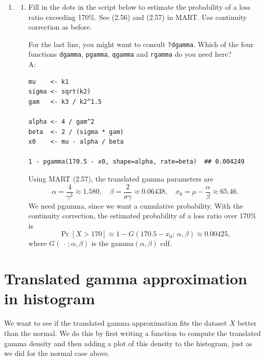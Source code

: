 \documentclass{article}
\begin{document}
\begin{enumerate}
  \item[$\boldsymbol{Q_4}$]
    \begin{enumerate}
      \item[] Fill in the dots in the script below to estimate the probability of a loss ratio exceeding 170\%. See (2.56) and (2.57) in MART. Use continuity correction as before.

      For the last line, you might want to consult \texttt{?dgamma}. Which of the four functions \texttt{dgamma}, \texttt{pgamma}, \texttt{qgamma} and \texttt{rgamma} do you need here?\\ A:

\begin{lstlisting}
mu    <- k1
sigma <- sqrt(k2)
gam   <- k3 / k2^1.5

alpha <- 4 / gam^2
beta  <- 2 / (sigma * gam)
x0    <- mu - alpha / beta

1 - pgamma(170.5 - x0, shape=alpha, rate=beta)  ## 0.004249
\end{lstlisting}

      Using MART (2.57), the translated gamma parameters are
      \[
        \alpha = \frac{4}{\gamma^2} \approx 1.580, \quad
        \beta  = \frac{2}{\sigma\gamma} \approx 0.06438, \quad
        x_0    = \mu - \frac{\alpha}{\beta} \approx 65.46.
      \]
      We need pgamma, since we want a cumulative probability. With the continuity correction, the estimated probability of a loss ratio over 170\% is
      \[
        \Pr[X > 170] \approx 1 - G(170.5 - x_0;\, \alpha, \beta) \approx 0.00425,
      \]
      where $G(\,\cdot\,;\alpha,\beta)$ is the $\mathrm{gamma}(\alpha,\beta)$ cdf.
    \end{enumerate}
\end{enumerate}

\newpage
\section{Translated gamma approximation in histogram}
We want to see if the translated gamma approximation fits the dataset $X$ better than the normal. We do this by first writing a function to compute the translated gamma density and then adding a plot of this density to the histogram, just as we did for the normal case above.
\end{document}
